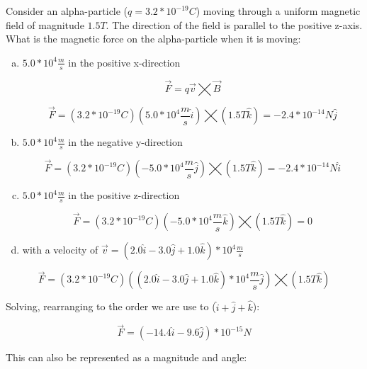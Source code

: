 \documentclass[14pt]{memoir}
\begin{document}
Consider an alpha-particle ($q = 3.2 * 10^{-19} C$) moving through a uniform magnetic field of magnitude $1.5T$. The direction of the field is parallel to the positive z-axis. What is the magnetic force on the alpha-particle when it is moving:
\begin{enumerate}[(a)]
\item $5.0 * 10^4 \frac{m}{s}$ in the positive x-direction

\begin{equation}
\vec{F} = q \vec{v} \bigtimes \vec{B}
\end{equation}

\begin{equation}
\vec{F} = (3.2 * 10^{-19} C)( 5.0 * 10^4 \frac{m}{s} \hat{i}) \bigtimes (1.5 T \hat{k}) = -2.4 * 10^{-14} N \hat{j}
\end{equation}

\item $5.0 * 10^4 \frac{m}{s}$ in the negative y-direction

\begin{equation}
\vec{F} = (3.2 * 10^{-19} C)( -5.0 * 10^4 \frac{m}{s} \hat{j}) \bigtimes (1.5 T \hat{k}) = -2.4 * 10^{-14} N \hat{i}
\end{equation}

\item $5.0 * 10^4 \frac{m}{s}$ in the positive z-direction

\begin{equation}
\vec{F} = (3.2 * 10^{-19} C)( -5.0 * 10^4 \frac{m}{s} \hat{k}) \bigtimes (1.5 T \hat{k}) = 0
\end{equation}

\item with a velocity of $\vec{v} = (2.0 \hat{i} - 3.0 \hat{j} + 1.0 \hat{k}) * 10^4 \frac{m}{s}$
\end{enumerate}

\begin{equation}
\vec{F} = (3.2 * 10^{-19} C)( (2.0 \hat{i} - 3.0 \hat{j} + 1.0 \hat{k}) * 10^4 \frac{m}{s} \hat{j}) \bigtimes (1.5 T \hat{k})
\end{equation}

Solving, rearranging to the order we are use to ($\hat{i} + \hat{j} + \hat{k}$):

\begin{equation}
\vec{F} = (-14.4 \hat{i} - 9.6 \hat{j})* 10^{-15} N 
\end{equation}

This can also be represented as a magnitude and angle:
\end{document}
